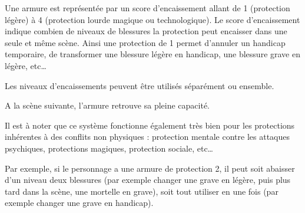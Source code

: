 \begin{multicols}{2}
Une armure est représentée par un score d'encaissement allant de 1 (protection légère) à 4 (protection lourde magique ou technologique). Le score d'encaissement indique combien de niveaux de blessures la protection peut encaisser dans une seule et même scène. Ainsi une protection de 1 permet d'annuler un handicap temporaire, de transformer une blessure légère en handicap, une blessure grave en légère, etc… 

Les niveaux d'encaissements peuvent être utilisés séparément ou ensemble. 

A la scène suivante, l'armure retrouve sa pleine capacité. 

Il est à noter que ce système fonctionne également très bien pour les protections inhérentes à des conflits non physiques : protection mentale contre les attaques psychiques, protections magiques, protection sociale, etc…

\end{multicols}

{
	Par exemple, si le personnage a une armure de protection 2, il peut soit abaisser d'un niveau deux blessures (par exemple changer une grave en légère, puis plus tard dans la scène, une mortelle en grave), soit tout utiliser en une fois (par exemple changer une grave en handicap).
}

\clearpage

